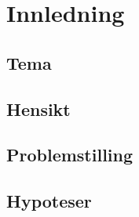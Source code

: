 \section{Innledning}

\subsection{Tema}

\subsection{Hensikt}

\subsection{Problemstilling}

\subsection{Hypoteser}

\newpage